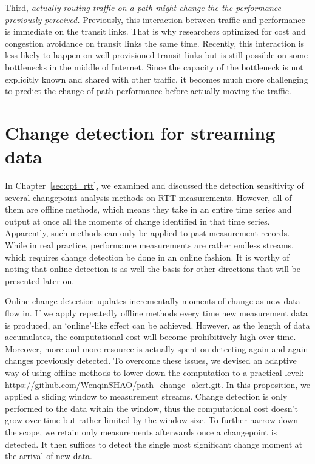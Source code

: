 Third, \textit{actually routing traffic on a path might change the the performance previously perceived.} Previously, this interaction between traffic and performance is immediate on the transit links. That is why researchers optimized for cost and congestion avoidance on transit links the same time. Recently, this interaction is less likely to happen on well provisioned transit links but is still possible on some bottlenecks in the middle of Internet. Since the capacity of the bottleneck is not explicitly known and shared with other traffic, it becomes much more challenging to predict the change of path performance before actually moving the traffic.  
\fi


\section{Change detection for streaming data}
In Chapter~\ref{sec:cpt_rtt}, we examined and discussed the detection sensitivity of several changepoint analysis methods on RTT measurements. However, all of them are offline methods, which means they take in an entire time series and output at once all the moments of change identified in that time series.
Apparently, such methods can only be applied to past measurement records. 
While in real practice, performance measurements are rather endless streams, which requires change detection be done in an online fashion. It is worthy of noting that online detection is as well the basis for other directions that will be presented later on.

Online change detection updates incrementally moments of change as new data flow in.
If we apply repeatedly offline methods every time new measurement data is produced, an `online'-like effect can be achieved. However, as the length of data accumulates, the computational cost will become prohibitively high over time. Moreover, more and more resource is actually spent on detecting again and again changes previously detected.
To overcome these issues, we devised an adaptive way of using offline methods to lower down the computation to a practical level: \url{https://github.com/WenqinSHAO/path_change_alert.git}. 
In this proposition, we applied a sliding window to measurement streams. Change detection is only performed to the data within the window, thus the computational cost doesn't grow over time but rather limited by the window size. To further narrow down the scope, we retain only measurements afterwards once a changepoint is detected. It then suffices to detect the single most significant change moment at the arrival of new data.

